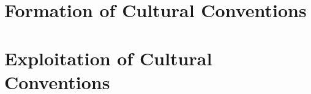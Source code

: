 \documentclass[a4paper,11pt,twoside,openany,final]{memoir} %
\begin{document}
\fontsize{10.5pt}{13.5pt}\selectfont %


\maketitle


\frontmatter

% 
\clearpage

\dominitoc
\tableofcontents





\printglossaries



\mainmatter





\part{Formation of Cultural Conventions}
\label{part:formation}

%


\part{Exploitation of Cultural Conventions}
\label{part:exploitation}
%
%
%

%

%
%


\appendixpage
\appendix

%
%
%


\backmatter

\clearpage




\end{document}
